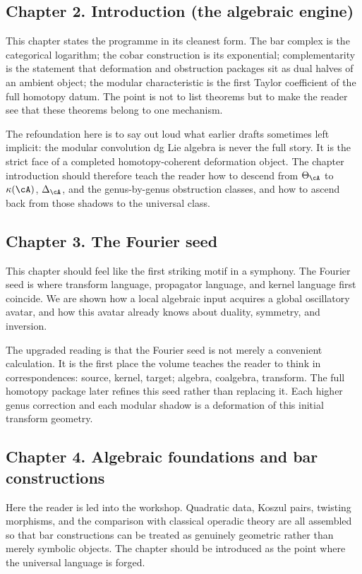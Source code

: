 \subsection*{Chapter 2. Introduction (the algebraic engine)}
This chapter states the programme in its cleanest form.  The bar complex is the categorical logarithm; the cobar construction is its exponential; complementarity is the statement that deformation and obstruction packages sit as dual halves of an ambient object; the modular characteristic is the first Taylor coefficient of the full homotopy datum.  The point is not to list theorems but to make the reader see that these theorems belong to one mechanism.

The refoundation here is to say out loud what earlier drafts sometimes left implicit: the modular convolution dg Lie algebra is never the full story.  It is the strict face of a completed homotopy-coherent deformation object.  The chapter introduction should therefore teach the reader how to descend from $\Theta_{\cA}$ to $\kappa(\cA)$, $\Delta_{\cA}$, and the genus-by-genus obstruction classes, and how to ascend back from those shadows to the universal class.

\subsection*{Chapter 3. The Fourier seed}
This chapter should feel like the first striking motif in a symphony.  The Fourier seed is where transform language, propagator language, and kernel language first coincide.  We are shown how a local algebraic input acquires a global oscillatory avatar, and how this avatar already knows about duality, symmetry, and inversion.

The upgraded reading is that the Fourier seed is not merely a convenient calculation.  It is the first place the volume teaches the reader to think in correspondences: source, kernel, target; algebra, coalgebra, transform.  The full homotopy package later refines this seed rather than replacing it.  Each higher genus correction and each modular shadow is a deformation of this initial transform geometry.

\subsection*{Chapter 4. Algebraic foundations and bar constructions}
Here the reader is led into the workshop.  Quadratic data, Koszul pairs, twisting morphisms, and the comparison with classical operadic theory are all assembled so that bar constructions can be treated as genuinely geometric rather than merely symbolic objects.  The chapter should be introduced as the point where the universal language is forged.

